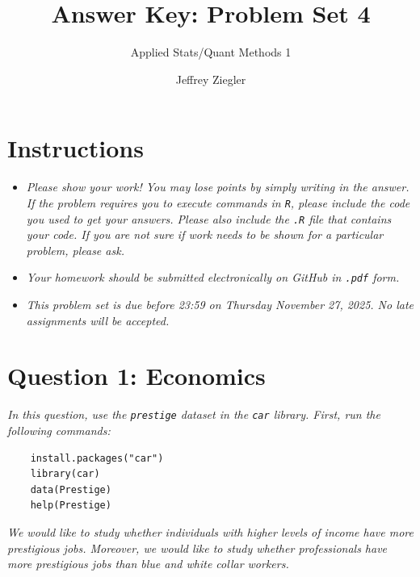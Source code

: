 \documentclass[12pt,letterpaper]{article}
\title{Answer Key: Problem Set 4}
\date{Jeffrey Ziegler}
\author{Applied Stats/Quant Methods 1}
\begin{document}
	\maketitle
	
	\section*{Instructions}
	\begin{itemize}
		\item \textit{Please show your work! You may lose points by simply writing in the answer. If the problem requires you to execute commands in \texttt{R}, please include the code you used to get your answers. Please also include the \texttt{.R} file that contains your code. If you are not sure if work needs to be shown for a particular problem, please ask.}
	\item \textit{Your homework should be submitted electronically on GitHub in \texttt{.pdf} form.}
	\item \textit{This problem set is due before 23:59 on Thursday November 27, 2025. No late assignments will be accepted.}
	\end{itemize}
		\vspace{.5cm}
	\section*{Question 1: Economics}
	\vspace{.25cm}
	\noindent 	\textit{In this question, use the \texttt{prestige} dataset in the \texttt{car} library. First, run the following commands:}
	
	\begin{verbatim}
	install.packages("car")
	library(car)
	data(Prestige)
	help(Prestige)
	\end{verbatim} 
	
	
	\noindent \textit{We would like to study whether individuals with higher levels of income have more prestigious jobs. Moreover, we would like to study whether professionals have more prestigious jobs than blue and white collar workers.}
	
\end{document}
